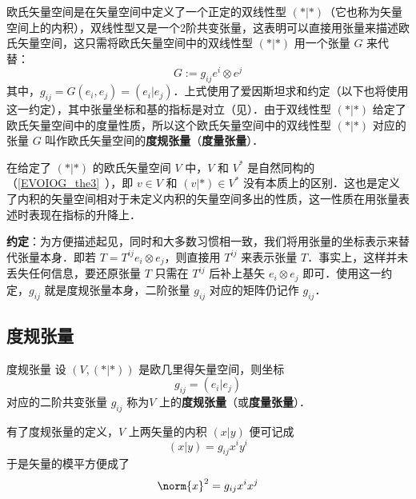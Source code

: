 
欧氏矢量空间是在矢量空间中定义了一个正定的双线性型 $(*|*)$（它也称为矢量空间上的内积），双线性型又是一个2阶共变张量，这表明可以直接用张量来描述欧氏矢量空间，这只需将欧氏矢量空间中的双线性型 $(*|*)$ 用一个张量 $G$ 来代替：
\begin{equation}
G:=g_{ij} e^i\otimes e^j
\end{equation}
其中，$g_{ij}=G(e_i,e_j)=(e_i|e_j)$．上式使用了爱因斯坦求和约定（以下也将使用这一约定），其中张量坐标和基的指标是对立（见）．由于双线性型 $(*|*)$ 给定了欧氏矢量空间中的度量性质，所以这个欧氏矢量空间中的双线性型 $(*|*)$ 对应的张量 $G$ 叫作欧氏矢量空间的\textbf{度规张量}（\textbf{度量张量}）．

在给定了 $(*|*)$ 的欧氏矢量空间 $V$ 中，$V$ 和 $V^*$ 是自然同构的（\autoref{EVOIOG_the3}~），即 $v\in V $ 和 $(v|*)\in V^*$ 没有本质上的区别．这也是定义了内积的矢量空间相对于未定义内积的矢量空间多出的性质，这一性质在用张量表述时表现在指标的升降上．

\textbf{约定}：为方便描述起见，同时和大多数习惯相一致，我们将用张量的坐标表示来替代张量本身．即若 $T=T^{ij} e_{i}\otimes e_{j}$，则直接用 $T^{ij}$ 来表示张量 $T$．事实上，这样并未丢失任何信息，要还原张量 $T$ 只需在 $T^{ij}$ 后补上基矢 $e_{i}\otimes e_{j}$ 即可．使用这一约定，$g_{ij}$ 就是度规张量本身，二阶张量 $g_{ij}$ 对应的矩阵仍记作 $g_{ij}$．
\subsection{度规张量}
\begin{definition}{度规张量}
设 $(V,(*|*))$ 是欧几里得矢量空间，则坐标
\begin{equation}
g_{ij}=(e_i|e_j)
\end{equation}
对应的二阶共变张量 $g_{ij}$ 称为$V$ 上的\textbf{度规张量}（或\textbf{度量张量}）．
\end{definition}
有了度规张量的定义，$V$ 上两矢量的内积 $(x|y)$ 便可记成
\begin{equation}
(x|y)=g_{ij}x^i y^i
\end{equation}
于是矢量的模平方便成了
\begin{equation}
\norm{x}^2=g_{ij}x^i x^j
\end{equation}

